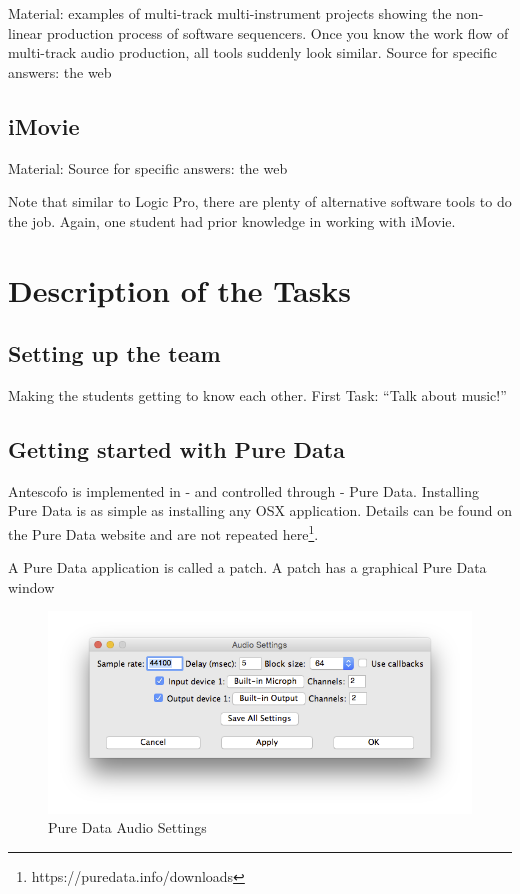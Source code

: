 \documentclass[onecolumn,nocopyrightspace,preprint]{sigplanconf}
\begin{document}
Material: examples of multi-track multi-instrument projects showing
the non-linear production process of software sequencers. Once you know
the work flow of multi-track audio production, all tools suddenly look similar.
Source for specific answers: the web

\subsection{iMovie}

Material: 
Source for specific answers: the web


Note that similar to Logic Pro, there are plenty of alternative software
tools to do the job. Again, one student had prior knowledge in working
with iMovie. 


\section{Description of the Tasks}

\subsection{Setting up the team}

Making the students getting to know each other. First Task: ``Talk about music!''

\subsection{Getting started with Pure Data}


Antescofo is implemented in - and controlled through - Pure Data.
Installing Pure Data is as simple as installing any OSX application. Details can be found
on the Pure Data website and are not repeated here\footnote{https://puredata.info/downloads}.

A Pure Data application is called a patch. A patch has a graphical Pure Data window



\begin{figure}[ht]
    \centering
    \includegraphics[scale=0.4]{fig/pd-audio.png}
    \caption{Pure Data Audio Settings}
    \label{fig:pd-audio}
\end{figure}
\end{document}
